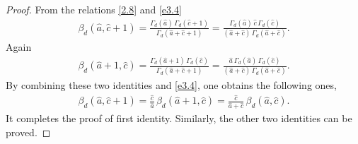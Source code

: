 \documentclass[11pt,a4paper,fleqn]{article}
\numberwithin{equation}{section}
\numberwithin{lemma}{section}
\numberwithin{theorem}{section}
\numberwithin{corollary}{section}
\begin{document}
\begin{proof}
	From the relations \eqref{2.8} and  \eqref{e3.4}
	\begin{align}
		\beta_d (\widehat{a}, \widehat{c} + 1) = \frac{\Gamma_d (\widehat{a})  \, \Gamma_d (\widehat{c} + 1)}{\Gamma_d (\widehat{a}  + \widehat{c} + 1)} = \frac{\Gamma_d (\widehat{a})  \, \widehat{c} \, \Gamma_d (\widehat{c})}{(\widehat{a}  + \widehat{c}) \, \Gamma_d (\widehat{a}  + \widehat{c})}.
	\end{align}
	Again
	\begin{align}
		\beta_d (\widehat{a} + 1, \widehat{c}) = \frac{\Gamma_d (\widehat{a} + 1)  \, \Gamma_d (\widehat{c})}{\Gamma_d (\widehat{a}  + \widehat{c} + 1)} = \frac{\widehat{a} \, \Gamma_d (\widehat{a})  \, \Gamma_d (\widehat{c})}{(\widehat{a}  + \widehat{c}) \, \Gamma_d (\widehat{a}  + \widehat{c})}.
	\end{align}
	By combining these two identities and \eqref{e3.4}, one obtains the following ones,
	\begin{align}
		\beta_d (\widehat{a}, \widehat{c} + 1) = \frac{\widehat{c}}{\widehat{a}} \, \beta_d (\widehat{a} + 1, \widehat{c}) = \frac{\widehat{c}}{\widehat{a} + \widehat{c}} \, \beta_d (\widehat{a}, \widehat{c}).
	\end{align}
	It completes the proof of first identity. Similarly, the other two identities can be proved.
\end{proof}
\end{document}
